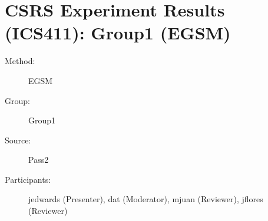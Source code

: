 \chapter {CSRS Experiment Results (ICS411): Group1 (EGSM)}
\small
	  

\begin{description}
\item [Method:] EGSM
\item [Group:] Group1
\item [Source:] Pass2
\item [Participants:] jedwards (Presenter), dat (Moderator), mjuan (Reviewer), jflores (Reviewer)
\end{description}
